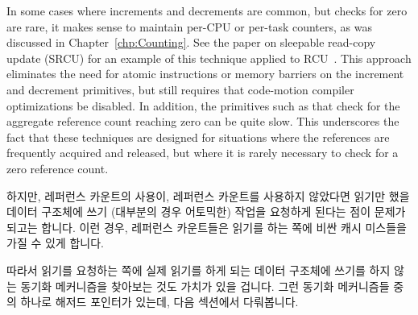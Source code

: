 In some cases where increments and decrements are common, but checks
for zero are rare, it makes sense to maintain per-CPU or per-task
counters, as was discussed in Chapter~\ref{chp:Counting}.
See the paper on sleepable read-copy update
(SRCU) for an example of this technique applied to
RCU~\cite{PaulEMcKenney2006c}.
This approach eliminates the need for atomic instructions or memory
barriers on the increment and decrement primitives, but still requires
that code-motion compiler optimizations be disabled.
In addition, the primitives such as 
that check for the aggregate reference
count reaching zero can be quite slow.
This underscores the fact that these techniques are designed
for situations where the references are frequently acquired and
released, but where it is rarely necessary to check for a zero
reference count.
\fi


하지만, 레퍼런스 카운트의 사용이, 레퍼런스 카운트를 사용하지 않았다면 읽기만
했을 데이터 구조체에 쓰기 (대부분의 경우 어토믹한) 작업을 요청하게 된다는 점이
문제가 되고는 합니다.
이런 경우, 레퍼런스 카운트들은 읽기를 하는 쪽에 비싼 캐시 미스들을 가질 수 있게
합니다.

따라서 읽기를 요청하는 쪽에 실제 읽기를 하게 되는 데이터 구조체에 쓰기를 하지
않는 동기화 메커니즘을 찾아보는 것도 가치가 있을 겁니다.
그런 동기화 메커니즘들 중의 하나로 해저드 포인터가 있는데, 다음 섹션에서
다뤄봅니다.
\iffalse

However, it is usually the case that use of reference counts requires
writing (often atomically) to a data structure that is otherwise
read only.
In this case, reference counts are imposing expensive cache misses
on readers.

It is therefore worthwhile to look into synchronization mechanisms
that do not require readers to write to the data structure being
traversed.
One such synchronization mechanism, hazard pointers, is covered in
the next section.
\fi
